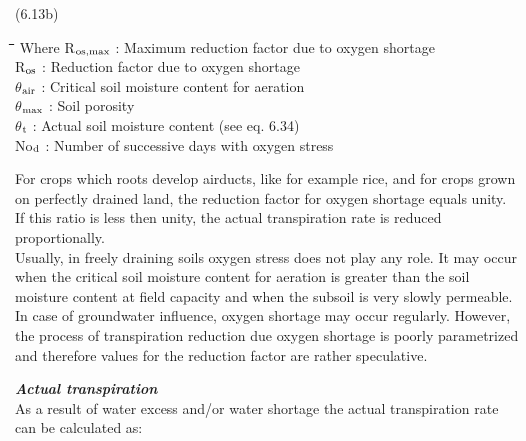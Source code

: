 \documentclass[11pt]{article}
\begin{document}
\bigskip
\strut\hfill (6.13b)

\bigskip
\nwln
\begin{tabbing}
\hspace{1.27cm}\=\hspace{1.27cm}\=\hspace{1.27cm}\=\hspace{1.27cm}\=%
\hspace{1.27cm}\=\hspace{1.27cm}\=\hspace{1.27cm}\=\hspace{1.27cm}\=%
\hspace{1.27cm}\=\hspace{1.27cm}\=\kill
Where\> \> R$_{{\rm os,max}}$\> : Maximum reduction factor due to oxygen shortage\> \> \> \> \> \> \> [-]\\
\>\> R$_{{\rm os}}$\> : Reduction factor due to oxygen shortage\> \> \> \> \> \> \> [-]\\
\>\> $\theta$$_{{\rm air}}$\> : Critical soil moisture content for aeration\> \> \> \> \> \> \> [cm$^{{\rm 3}}$ cm$^{{\rm -3}}$]\\
\>\> $\theta$$_{{\rm max}}$\> : Soil porosity\> \> \> \> \> \> \> [cm$^{{\rm 3}}$ cm$^{{\rm -3}}$]\\
\>\> $\theta$$_{{\rm t}}$\> : Actual soil moisture content (see eq. 6.34)\> \> \> \> \> \> \> [cm$^{{\rm 3}}$ cm$^{{\rm -3}}$]\\
\>\> No$_{{\rm d}}$\> : Number of successive days with oxygen stress\> \> \> \> \> \> \> [-]
\end{tabbing}

\bigskip
\bigskip
For crops which roots develop airducts, like for example rice, and for crops grown on
perfectly drained land, the reduction factor for oxygen shortage equals unity. If this ratio
is less then unity, the actual transpiration rate is reduced proportionally. \\
Usually, in freely draining soils oxygen stress does not play any role. It may occur when
the critical soil moisture content for aeration is greater than the soil moisture content at
field capacity and when the subsoil is very slowly permeable. In case of groundwater
influence, oxygen shortage may occur regularly. However, the process of transpiration
reduction due oxygen shortage is poorly parametrized and therefore values for the
reduction factor are rather speculative. 

\bigskip
\bigskip
{\bf {\it Actual transpiration\/}}\\
As a result of water excess and/or water shortage the actual transpiration rate can be
calculated as:
\end{document}
